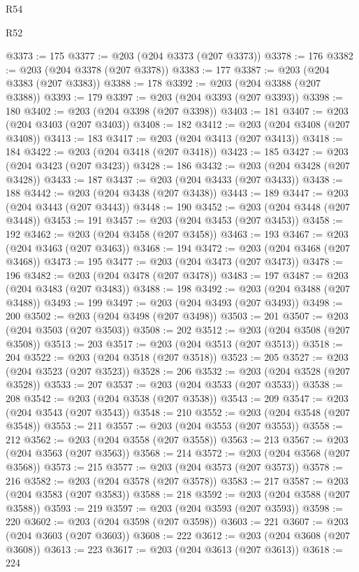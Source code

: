 \begin{lexlean}{R54}
\begin{lexlean}{R52}
\begin{coremodule}
{{{{{{{{{{{{{{{{{{{{{{{{{{{{{{{{{{{{{{{{{{{{{{{{{{{{{{{{{{{{{{{{{{{{{{{{{{{{{{{{{{{{{{{{{{{{{{{{{{{{{{{{{{{{{{{{{{{{{{{{{{{{{{{{{{{{{{{{{{{{{{{{{{{{{{{{{{{{{{{{{{{{{{{{{{{{{{{{{{{{{{{{{{{{{{{{{{{{{{@3373 := 175
@3377 := @203 (@204 @3373 (@207 @3373))
@3378 := 176
@3382 := @203 (@204 @3378 (@207 @3378))
@3383 := 177
@3387 := @203 (@204 @3383 (@207 @3383))
@3388 := 178
@3392 := @203 (@204 @3388 (@207 @3388))
@3393 := 179
@3397 := @203 (@204 @3393 (@207 @3393))
@3398 := 180
@3402 := @203 (@204 @3398 (@207 @3398))
@3403 := 181
@3407 := @203 (@204 @3403 (@207 @3403))
@3408 := 182
@3412 := @203 (@204 @3408 (@207 @3408))
@3413 := 183
@3417 := @203 (@204 @3413 (@207 @3413))
@3418 := 184
@3422 := @203 (@204 @3418 (@207 @3418))
@3423 := 185
@3427 := @203 (@204 @3423 (@207 @3423))
@3428 := 186
@3432 := @203 (@204 @3428 (@207 @3428))
@3433 := 187
@3437 := @203 (@204 @3433 (@207 @3433))
@3438 := 188
@3442 := @203 (@204 @3438 (@207 @3438))
@3443 := 189
@3447 := @203 (@204 @3443 (@207 @3443))
@3448 := 190
@3452 := @203 (@204 @3448 (@207 @3448))
@3453 := 191
@3457 := @203 (@204 @3453 (@207 @3453))
@3458 := 192
@3462 := @203 (@204 @3458 (@207 @3458))
@3463 := 193
@3467 := @203 (@204 @3463 (@207 @3463))
@3468 := 194
@3472 := @203 (@204 @3468 (@207 @3468))
@3473 := 195
@3477 := @203 (@204 @3473 (@207 @3473))
@3478 := 196
@3482 := @203 (@204 @3478 (@207 @3478))
@3483 := 197
@3487 := @203 (@204 @3483 (@207 @3483))
@3488 := 198
@3492 := @203 (@204 @3488 (@207 @3488))
@3493 := 199
@3497 := @203 (@204 @3493 (@207 @3493))
@3498 := 200
@3502 := @203 (@204 @3498 (@207 @3498))
@3503 := 201
@3507 := @203 (@204 @3503 (@207 @3503))
@3508 := 202
@3512 := @203 (@204 @3508 (@207 @3508))
@3513 := 203
@3517 := @203 (@204 @3513 (@207 @3513))
@3518 := 204
@3522 := @203 (@204 @3518 (@207 @3518))
@3523 := 205
@3527 := @203 (@204 @3523 (@207 @3523))
@3528 := 206
@3532 := @203 (@204 @3528 (@207 @3528))
@3533 := 207
@3537 := @203 (@204 @3533 (@207 @3533))
@3538 := 208
@3542 := @203 (@204 @3538 (@207 @3538))
@3543 := 209
@3547 := @203 (@204 @3543 (@207 @3543))
@3548 := 210
@3552 := @203 (@204 @3548 (@207 @3548))
@3553 := 211
@3557 := @203 (@204 @3553 (@207 @3553))
@3558 := 212
@3562 := @203 (@204 @3558 (@207 @3558))
@3563 := 213
@3567 := @203 (@204 @3563 (@207 @3563))
@3568 := 214
@3572 := @203 (@204 @3568 (@207 @3568))
@3573 := 215
@3577 := @203 (@204 @3573 (@207 @3573))
@3578 := 216
@3582 := @203 (@204 @3578 (@207 @3578))
@3583 := 217
@3587 := @203 (@204 @3583 (@207 @3583))
@3588 := 218
@3592 := @203 (@204 @3588 (@207 @3588))
@3593 := 219
@3597 := @203 (@204 @3593 (@207 @3593))
@3598 := 220
@3602 := @203 (@204 @3598 (@207 @3598))
@3603 := 221
@3607 := @203 (@204 @3603 (@207 @3603))
@3608 := 222
@3612 := @203 (@204 @3608 (@207 @3608))
@3613 := 223
@3617 := @203 (@204 @3613 (@207 @3613))
@3618 := 224
}}}}}}}}}}}}}}}}}}}}}}}}}}}}}}}}}}}}}}}}}}}}}}}}}}}}}}}}}}}}}}}}}}}}}}}}}}}}}}}}}}}}}}}}}}}}}}}}}}}}}}}}}}}}}}}}}}}}}}}}}}}}}}}}}}}}}}}}}}}}}}}}}}}}}}}}}}}}}}}}}}}}}}}}}}}}}}}}}}}}}}}}}}}}}}}}}}}}}}
\end{coremodule}
\end{lexlean}
\end{lexlean}
